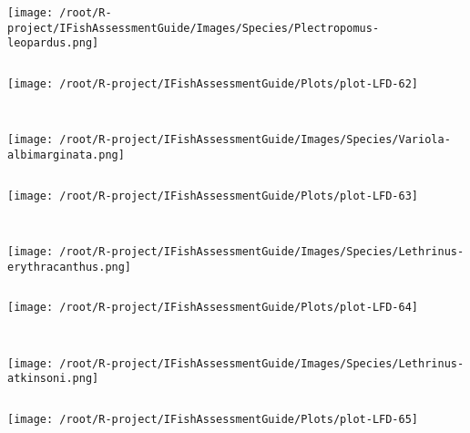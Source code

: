 \documentclass{report}\usepackage[]{graphicx}\usepackage[]{color}
\makeatletter
\def\maxwidth{ %
  \ifdim\Gin@nat@width>\linewidth
    \linewidth
  \else
    \Gin@nat@width
  \fi
}
\newenvironment{kframe}{%
 \def\at@end@of@kframe{}%
 \ifinner\ifhmode%
  \def\at@end@of@kframe{\end{minipage}}%
  \begin{minipage}{\columnwidth}%
 \fi\fi%
 \def\FrameCommand##1{\hskip\@totalleftmargin \hskip-\fboxsep
 \colorbox{shadecolor}{##1}\hskip-\fboxsep
     \hskip-\linewidth \hskip-\@totalleftmargin \hskip\columnwidth}%
 \MakeFramed {\advance\hsize-\width
   \@totalleftmargin\z@ \linewidth\hsize
   \@setminipage}}%
 {\par\unskip\endMakeFramed%
 \at@end@of@kframe}
\newenvironment{knitrout}{}{} %
\makeatother
\begin{document}
\begin{knitrout}
\begin{kframe}
\begin{verbatim}
\end{verbatim}
\end{kframe}
\texttt{[image: /root/R-project/IFishAssessmentGuide/Images/Species/Plectropomus-leopardus.png]}
\begin{kframe}\begin{verbatim}
\end{verbatim}
\end{kframe}
\texttt{[image: /root/R-project/IFishAssessmentGuide/Plots/plot-LFD-62]} 
\begin{kframe}\begin{verbatim}
 
\end{verbatim}
\end{kframe}
\texttt{[image: /root/R-project/IFishAssessmentGuide/Images/Species/Variola-albimarginata.png]}
\begin{kframe}\begin{verbatim}
\end{verbatim}
\end{kframe}
\texttt{[image: /root/R-project/IFishAssessmentGuide/Plots/plot-LFD-63]} 
\begin{kframe}\begin{verbatim}
 
\end{verbatim}
\end{kframe}
\texttt{[image: /root/R-project/IFishAssessmentGuide/Images/Species/Lethrinus-erythracanthus.png]}
\begin{kframe}\begin{verbatim}
\end{verbatim}
\end{kframe}
\texttt{[image: /root/R-project/IFishAssessmentGuide/Plots/plot-LFD-64]} 
\begin{kframe}\begin{verbatim}
 
\end{verbatim}
\end{kframe}
\texttt{[image: /root/R-project/IFishAssessmentGuide/Images/Species/Lethrinus-atkinsoni.png]}
\begin{kframe}\begin{verbatim}
\end{verbatim}
\end{kframe}
\texttt{[image: /root/R-project/IFishAssessmentGuide/Plots/plot-LFD-65]} 
\begin{kframe}\begin{verbatim}
 

\end{verbatim}
\end{kframe}
\end{knitrout}
\end{document}
